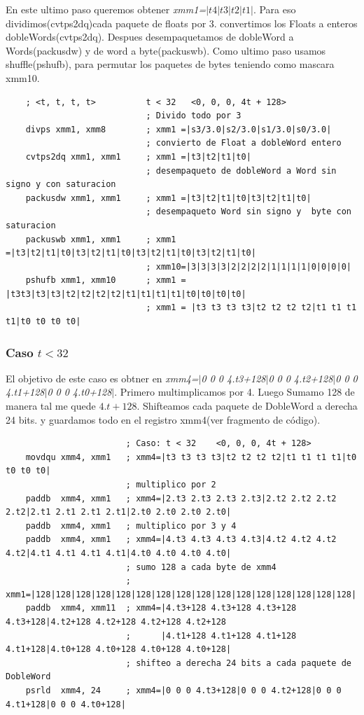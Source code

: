 En este ultimo paso queremos obtener \emph{xmm1=$|t4|t3|t2|t1|$}. Para eso dividimos(cvtps2dq)cada paquete de floats por 3.
convertimos los Floats a enteros dobleWords(cvtps2dq).
Despues desempaquetamos de dobleWord a Words(packusdw) y de word a byte(packuswb).
Como ultimo paso usamos shuffle(pshufb), para permutar los paquetes de bytes teniendo como mascara xmm10. 
\begin{codesnippet}
\begin{verbatim}
    ; <t, t, t, t>          t < 32   <0, 0, 0, 4t + 128>
                            ; Divido todo por 3
    divps xmm1, xmm8        ; xmm1 =|s3/3.0|s2/3.0|s1/3.0|s0/3.0| 
                            ; convierto de Float a dobleWord entero
    cvtps2dq xmm1, xmm1     ; xmm1 =|t3|t2|t1|t0|
                            ; desempaqueto de dobleWord a Word sin signo y con saturacion
    packusdw xmm1, xmm1     ; xmm1 =|t3|t2|t1|t0|t3|t2|t1|t0|
                            ; desempaqueto Word sin signo y  byte con saturacion
    packuswb xmm1, xmm1     ; xmm1 =|t3|t2|t1|t0|t3|t2|t1|t0|t3|t2|t1|t0|t3|t2|t1|t0| 
                            ; xmm10=|3|3|3|3|2|2|2|2|1|1|1|1|0|0|0|0|
    pshufb xmm1, xmm10      ; xmm1 = |t3t3|t3|t3|t2|t2|t2|t2|t1|t1|t1|t1|t0|t0|t0|t0|
                            ; xmm1 = |t3 t3 t3 t3|t2 t2 t2 t2|t1 t1 t1 t1|t0 t0 t0 t0|

\end{verbatim}
\end{codesnippet}

\subsubsection*{Caso $t<32$}
El objetivo de este caso es obtner en \emph{xmm4=$|$0 0 0 4.t3+128$|$0 0 0 4.t2+128$|$0 0 0 4.t1+128$|$0 0 0 4.t0+128$|$}.
Primero multimplicamos por 4.
Luego Sumamo 128 de manera tal me quede $4.t+128$. 
Shifteamos cada paquete de DobleWord a derecha 24 bits.
y guardamos todo en el registro xmm4(ver fragmento de código).

\begin{codesnippet}
\begin{verbatim}
                        ; Caso: t < 32    <0, 0, 0, 4t + 128>
    movdqu xmm4, xmm1   ; xmm4=|t3 t3 t3 t3|t2 t2 t2 t2|t1 t1 t1 t1|t0 t0 t0 t0|
                        ; multiplico por 2
    paddb  xmm4, xmm1   ; xmm4=|2.t3 2.t3 2.t3 2.t3|2.t2 2.t2 2.t2 2.t2|2.t1 2.t1 2.t1 2.t1|2.t0 2.t0 2.t0 2.t0|   
    paddb  xmm4, xmm1   ; multiplico por 3 y 4
    paddb  xmm4, xmm1   ; xmm4=|4.t3 4.t3 4.t3 4.t3|4.t2 4.t2 4.t2 4.t2|4.t1 4.t1 4.t1 4.t1|4.t0 4.t0 4.t0 4.t0| 
                        ; sumo 128 a cada byte de xmm4
                        ; xmm1=|128|128|128|128|128|128|128|128|128|128|128|128|128|128|128|128|
    paddb  xmm4, xmm11  ; xmm4=|4.t3+128 4.t3+128 4.t3+128 4.t3+128|4.t2+128 4.t2+128 4.t2+128 4.t2+128
                        ;      |4.t1+128 4.t1+128 4.t1+128 4.t1+128|4.t0+128 4.t0+128 4.t0+128 4.t0+128|
                        ; shifteo a derecha 24 bits a cada paquete de DobleWord
    psrld  xmm4, 24     ; xmm4=|0 0 0 4.t3+128|0 0 0 4.t2+128|0 0 0 4.t1+128|0 0 0 4.t0+128|
\end{verbatim}
\end{codesnippet}

